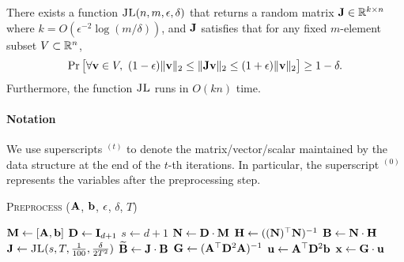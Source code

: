 \begin{lemma}\label{lem:JL}
There exists a function $\textsc{JL}(n,m,\epsilon, \delta)$ that returns a random matrix $\mathbf{J} \in \mathbb{R}^{k \times n}$ where $k = O(\epsilon^{-2} \log(m/\delta))$, and $\mathbf{J}$ satisfies that for any fixed $m$-element subset $V \subset \mathbb{R}^n$,
\begin{align*}
    \Pr\big[\forall \mathbf{v} \in V, ~ (1 - \epsilon) \|\mathbf{v}\|_2 \leq \|\mathbf{J} \mathbf{v}\|_2 \leq (1 + \epsilon) \|\mathbf{v}\|_2\big] \geq 1 - \delta.
\end{align*}
Furthermore, the function $\textsc{JL}$ runs in $O(kn)$ time.
\end{lemma}




\paragraph{Notation} We use superscripts $^{(t)}$ to denote the matrix/vector/scalar maintained by the data structure at the end of the $t$-th iterations. In particular, the superscript $^{(0)}$ represents the variables after the preprocessing step. 




\begin{algorithm}[!htbp]
\caption{\textsc{Preprocess} ($\mathbf{A}$, $\mathbf{b}$, $\epsilon$, $\delta$, $T$)}
\label{algo:preprocess}
\begin{algorithmic}[1]
    \State $\mathbf{M} \leftarrow [\mathbf{A}, \mathbf{b}]$ 
    \State $\mathbf{D} \leftarrow \mathbf{I}_{d+1}$  
    \State $s \leftarrow d+1$ 
    \State $\mathbf{N} \leftarrow \mathbf{D} \cdot \mathbf{M}$  
    \State $\mathbf{H} \leftarrow ((\mathbf{N})^{\top} \mathbf{N} )^{-1}$ \label{line:H_0} 
    \State $\mathbf{B} \leftarrow \mathbf{N} \cdot \mathbf{H}$ 
    \State $\mathbf{J} \leftarrow \textsc{JL}(s, T, \frac{1}{100}, \frac{\delta}{2 T^2})$ 
    \State $\widetilde{\mathbf{B}} \leftarrow \mathbf{J} \cdot \mathbf{B}$ \label{line:wt_B_0} 
    \State $\mathbf{G} \leftarrow (\mathbf{A}^{\top}\mathbf{D}^2 \mathbf{A})^{-1}$ \label{line:G_0} 
    \State $\mathbf{u} \leftarrow \mathbf{A}^{\top} \mathbf{D}^2 \mathbf{b}$ 
    \State $\mathbf{x} \leftarrow \mathbf{G}\cdot \mathbf{u}$ 
\end{algorithmic}
\end{algorithm}


